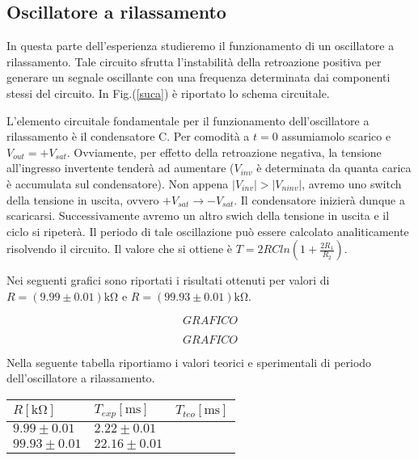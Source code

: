 \subsection{Oscillatore a rilassamento}
In questa parte dell'esperienza studieremo il funzionamento di un oscillatore a rilassamento. Tale circuito sfrutta l'instabilità della retroazione positiva per generare un segnale oscillante con una frequenza determinata dai componenti stessi del circuito. In Fig.(\ref{suca}) è riportato lo schema circuitale. 

L'elemento circuitale fondamentale per il funzionamento dell'oscillatore a rilassamento è il condensatore C. Per comodità a $t=0$ assumiamolo scarico e $V_{out}=+V_{sat}$. Ovviamente, per effetto della retroazione negativa, la tensione all'ingresso invertente tenderà ad aumentare ($V_{inv}$ è determinata da quanta carica è accumulata sul condensatore). Non appena $|V_{inv}|>|V_{ninv}|$, avremo uno switch della tensione in uscita, ovvero $+V_{sat} \rightarrow -V_{sat}$. Il condensatore inizierà dunque a scaricarsi. Successivamente avremo un altro swich della tensione in uscita e il ciclo si ripeterà. Il periodo di tale oscillazione può essere calcolato analiticamente risolvendo il circuito. Il valore che si ottiene è $T=2RCln(1+\frac{2R_1}{R_2})$.  

Nei seguenti grafici sono riportati i risultati ottenuti per valori di $R=(9.99\pm0.01)\si{\kilo\ohm}$ e $R=(99.93\pm0.01)\si{\kilo\ohm}$.


$$GRAFICO$$

$$GRAFICO$$

Nella seguente tabella riportiamo i valori teorici e sperimentali di periodo dell'oscillatore a rilassamento.

\begin{tabular}{|l|l|l|}
\hline
$R [\si{\kilo\ohm}]$	&  $T_{exp} [\si{\milli\second}]$          & $T_{teo} [\si{\milli\second}]$       \\
\hline
$9.99\pm0.01 $ & $2.22\pm0.01$ & \\
\hline
$99.93\pm0.01 $ & $22.16\pm0.01$ & \\
\hline
\end{tabular} 
